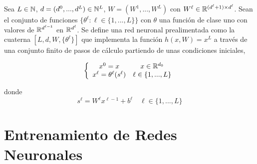     \begin{definicion}
    Sea $L \in \mathbb{N}$, $d =(d^0,...,d^L) \in \mathbb{N}^L$, $W=(W^1,...,W^L)$ con $W^{\ell} \in \mathbb{R}^{(d^{\ell} + 1)\times d^{\ell}}$. Sean el conjunto de funciones $\{\theta^{\ell}: \ell \in \{1,...,L\}\}$ con $\theta$ una función de clase uno con valores de $\mathbb{R}^{d^{\ell-1}}$ en $\mathbb{R}^{d^{\ell}}$. Se define una red neuronal prealimentada como la cuaterna $[L,d,W,\{\theta^{\ell}\}]$ que implementa la función $h(x,W) = x^L$ a través de una conjunto finito de pasos de cálculo partiendo de unas condiciones iniciales,
    
    \begin{equation}
        \left\{ 
        \begin{array}{cc}
             
             
             x^0 = x & x \in \mathbb{R}^{d_0} \\
             
             x^{\ell} = \theta^{\ell}(s^{\ell}) & \ell \in \{1,...,L\} 
        
        \end{array}
        \right.
    \end{equation}
    
%             
    
    \noindent donde
    \begin{equation}
        s^{\ell} = W^{\ell} x^{\ell - 1} + b^{\ell} \quad \ell \in \{1,...,L\}
    \end{equation}
    \end{definicion}


\section{Entrenamiento de Redes Neuronales}

